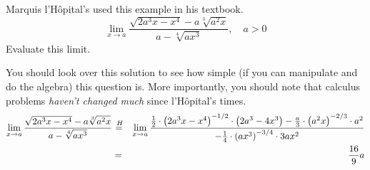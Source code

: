 \documentclass[12pt,addpoints, answers, fleqn]{exam}
\newcommand*\Heq{\ensuremath{\overset{\kern2pt H}{=}}}
\begin{document}
\begin{questions}


\question Marquis l'H\^{o}pital's used this example in his textbook.
\[
\mathop {\lim }\limits_{ x \to a} \frac{\sqrt{2a^3x-x^4} - a\sqrt[3]{a^2x}}{a - \sqrt[4]{ax^3}}, \quad a>0
\]
Evaluate this limit.
\begin{solution} You should look over this solution to see how simple (if you can manipulate and do the algebra) this question is. More importantly, you should note that calculus problems \emph{haven't changed much} since  l'H\^{o}pital's times.
\begin{eqnarray*}
\lim_{ x \to a} \frac{\sqrt{2a^3x-x^4} - a\sqrt[3]{a^2x}}{a - \sqrt[4]{ax^3}} &\Heq& \lim_{ x \to a} \frac{\frac{1}{2} \cdot \left( 2a^3x-x^4\right)^{-1/2} \cdot \left( 2a^3-4x^3\right) -  \frac{a}{3}  \cdot \left( a^2x\right)^{-2/3} \cdot a^2}{ -\frac{1}{4} \cdot  \left( ax^3 \right)^{-3/4} \cdot 3ax^2}\\
&=& \frac{16}{9}a
\end{eqnarray*}
\end{solution}




\end{questions}
\end{document}
